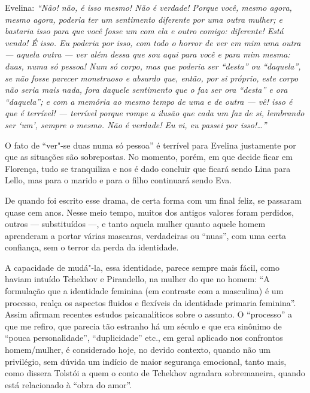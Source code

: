 Evelina: \emph{``Não! não, é isso mesmo! Não é verdade! Porque você, mesmo
agora, mesmo agora, poderia ter um sentimento diferente por uma outra
mulher; e bastaria isso para que você fosse um com ela e outro comigo:
diferente! Está vendo! É isso. Eu poderia por isso, com todo o horror de
ver em mim uma outra --- aquela outra --- ver além dessa que sou aqui para
você e para mim mesma: duas, numa só pessoa! Num só corpo, mas que
poderia ser ``desta'' ou ``daquela'', se não fosse parecer
monstruoso e absurdo que, então, por si próprio, este corpo não
seria mais nada, fora daquele sentimento que o faz ser ora ``desta'' e
ora ``daquela''; e com a memória ao mesmo tempo de uma e de outra --- vê!
isso é que é terrível! --- terrível porque rompe a ilusão que cada um faz
de si, lembrando ser `um', sempre o mesmo. Não é verdade! Eu vi, eu
passei por isso!\ldots{}''}

O fato de ``ver"-se duas numa só pessoa'' é terrível para Evelina
justamente por que as situações são sobrepostas. No momento, porém, em
que decide ficar em Florença, tudo se tranquiliza e nos é dado concluir
que ficará sendo Lina para Lello, mas para o marido e para o filho
continuará sendo Eva.

De quando foi escrito esse drama, de certa forma com um final feliz, se
passaram quase cem anos. Nesse meio tempo, muitos dos antigos valores
foram perdidos, outros --- substituídos ---, e tanto aquela mulher quanto
aquele homem aprenderam a portar várias mascaras, verdadeiras ou ``nuas'', com uma certa confiança, sem o terror da perda da identidade.

A capacidade de mudá"-la, essa identidade, parece sempre mais fácil, como
haviam intuído Tchekhov e Pirandello, na mulher do que no homem: ``A
formulação que a identidade feminina (em contraste com a masculina) é um
processo, realça os aspectos fluidos e flexíveis da identidade primaria
feminina''. Assim afirmam recentes estudos psicanalíticos sobre o
assunto. O ``processo'' a que me refiro, que parecia tão estranho há um
século e que era sinônimo de ``pouca personalidade'', ``duplicidade''
etc., em geral aplicado nos confrontos homem/mulher, é considerado hoje,
no devido contexto, quando não um privilégio, sem dúvida um indício de maior segurança
emocional, tanto mais, como dissera Tolstói a quem o conto
de Tchekhov agradara sobremaneira, quando está relacionado à ``obra
do amor''.



